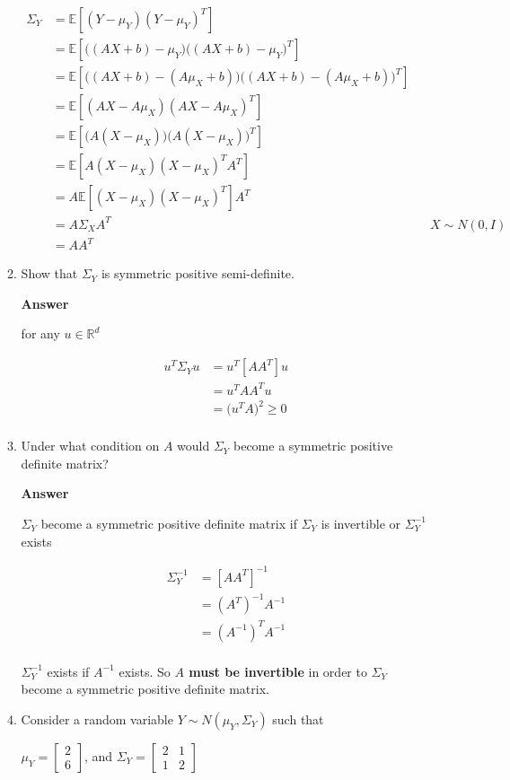 \documentclass[11pt]{article}
\begin{document}
\begin{enumerate}[label=(\alph*)]
\begin{enumerate}[label=(\roman*)]
\begin{align*}
\Sigma_Y& = \mathbb{E}[(Y-\mu_Y)(Y-\mu_Y)^T] \\
& = \mathbb{E}[\big((AX+b)-\mu_Y\big)\big((AX+b)-\mu_Y\big)^T] \\
& = \mathbb{E}[\big((AX+b)-(A\mu_X+b)\big)\big((AX+b)-(A\mu_X+b)\big)^T] \\
& = \mathbb{E}[(AX-A\mu_X)(AX-A\mu_X)^T] \\
& = \mathbb{E}[\big(A(X-\mu_X)\big)\big(A(X-\mu_X)\big)^T] \\
& = \mathbb{E}[A(X-\mu_X)(X-\mu_X)^TA^T] \\
& = A\mathbb{E}[(X-\mu_X)(X-\mu_X)^T]A^T \\
& = A\Sigma_XA^T && \text{$X \sim N(0,I)$} \\
& = AA^T
\end{align*}

\item Show that $\Sigma_Y$ is symmetric positive semi-definite.

\noindent\textbf{Answer}

for any $u \in \mathbb{R}^d$

\begin{align*}
u^T\Sigma_Yu & = u^T[AA^T]u \\
& = u^TAA^Tu \\ 
& = \big(u^TA\big)^2 \geq 0 \\  
\end{align*}

\item Under what condition on $A$ would $\Sigma_Y$ become a symmetric positive definite matrix?

\noindent\textbf{Answer}

 $\Sigma_Y$ become a symmetric positive definite matrix if $\Sigma_Y$ is invertible or $\Sigma_Y^{-1}$ exists

\begin{align*}
\Sigma_Y^{-1} & = [AA^T]^{-1} \\
& =  (A^T)^{-1}A^{-1} \\
& =  (A^{-1})^TA^{-1}\\  
\end{align*}

$\Sigma_Y^{-1}$ exists if $A^{-1}$ exists. So \textbf{$A$ must be invertible} in order to $\Sigma_Y$ become a symmetric positive definite matrix.

\item Consider a random variable $Y \sim N(\mu_Y,\Sigma_Y)$ such that 
\begin{center} 
$\mu_Y = 
\begin{bmatrix}
2\\
6
\end{bmatrix}
$, and $\Sigma_Y =
\begin{bmatrix}
2 & 1\\
1 & 2
\end{bmatrix}
$
\end{center}


\end{enumerate}
\end{enumerate}
\end{document}
